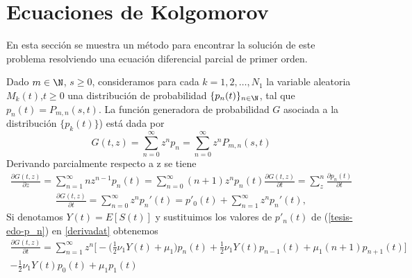 \section{Ecuaciones de Kolgomorov}
\begin{comment}
    Usando la ecuación de Chapman-Kolgomorov se obtiene que
    $$P_{m,n}(s,t)=\sum_{k=0}^\infty P_{m,k}(s,u)P_{k,n}(u,t),$$
    $$\Pi_{i,j}(s,t)=\sum_{k=0}^{N_2} \Pi_{i,k}(s,u)\Pi_{k,j}(u,t),$$
\end{comment}

En esta sección se muestra un método para encontrar la solución de este problema resolviendo una ecuación diferencial parcial de primer orden.

Dado $m\in\N$, $s\geq 0$, consideramos para cada $k=1,2,\ldots,N_1$ la variable aleatoria $M_k(t)$,$t\geq 0$ una distribución de probabilidad $\{p_n(t)\}_{n\in\N}$, tal que $p_n(t)=P_{m,n}(s,t)$. La función generadora de probabilidad $G$ asociada a la distribución $\{p_k(t)\}$) está dada por
\begin{equation}
    G(t,z)=\sum_{n=0}^\infty z^n p_n=\sum_{n=0}^\infty z^n P_{m,n}(s,t)\label{tesis-funcGeneradoraDeM}
\end{equation}
Derivando parcialmente respecto a z se tiene 
\begin{eqnarray}
  \label{derivadat}
    \frac{\partial G(t,z)}{\partial z}=\sum_{n=1}^\infty n z^{n-1}p_n(t)=\sum_{n=0}^\infty (n+1)z^{n}p_n(t)
    \frac{\partial G(t,z)}{\partial t} = \sum_z^n \frac{\partial p_n(t)}{\partial t}
\end{eqnarray}
\begin{eqnarray}
    \frac{\partial G(t,z)}{\partial t}=\sum_{n=0}^\infty z^n p_n'(t)=p'_0(t)+\sum_{n=1}^\infty z^n p_n'(t),
\end{eqnarray}
Si denotamos $Y(t)=E[S(t)]$ y sustituimos los valores de $p'_n(t)$ de (\ref{tesis-edo-p_n}) en  \ref{derivadat} obtenemos
\begin{eqnarray*}
    \frac{\partial G(t,z)}{\partial t} =\sum_{n=1}^\infty z^n\bigg[-\bigg(\frac{1}{2}\nu_1Y(t)+\mu_1\bigg)p_n(t)+\frac{1}{2}\nu_1Y(t)p_{n-1}(t)+\mu_1(n+1)p_{n+1}(t)\bigg]\\-\frac{1}{2}\nu_1Y(t)p_0(t)+\mu_1 p_1(t)
\end{eqnarray*}
